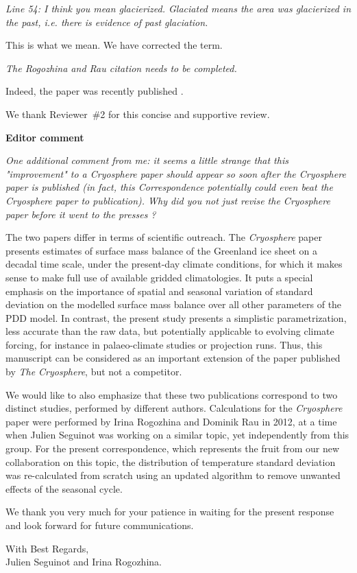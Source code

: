 \documentclass[10pt]{article}
\def\referee#1{\bigskip\textcolor{blue!50!black}{\textit{#1}}}
\begin{document}


\referee{Line 54: I think you mean glacierized. Glaciated means the area was glacierized in the past, i.e. there is evidence of past glaciation.}

This is what we mean. We have corrected the term.

\referee{The Rogozhina and Rau citation needs to be completed.}

Indeed, the paper was recently published \citep{rogozhina-rau-2014}.

We thank Reviewer~{\#}2 for this concise and supportive review.


\bigskip
\textbf{Editor comment}

\referee{One additional comment from me: it seems a little strange that this "improvement" to a \emph{Cryosphere} paper should appear so soon after the \emph{Cryosphere} paper is published (in fact, this Correspondence potentially could even beat the \emph{Cryosphere} paper to publication). Why did you not just revise the \emph{Cryosphere} paper before it went to the presses ?}

The two papers differ in terms of scientific outreach. The \emph{Cryosphere} paper presents estimates of surface mass balance of the Greenland ice sheet on a decadal time scale, under the present-day climate conditions, for which it makes sense to make full use of available gridded climatologies. It puts a special emphasis on the importance of spatial and seasonal variation of standard deviation on the modelled surface mass balance over all other parameters of the PDD model. In contrast, the present study presents a simplistic parametrization, less accurate than the raw data, but potentially applicable to evolving climate forcing, for instance in palaeo-climate studies or projection runs. Thus, this manuscript can be considered as an important extension of the paper published by \emph{The Cryosphere}, but not a competitor.

We would like to also emphasize that these two publications correspond to two distinct studies, performed by different authors. Calculations for the \emph{Cryosphere} paper were performed by Irina Rogozhina and Dominik Rau in 2012, at a time when Julien Seguinot was working on a similar topic, yet independently from this group. For the present correspondence, which represents the fruit from our new collaboration on this topic, the distribution of temperature standard deviation was re-calculated from scratch using an updated algorithm to remove unwanted effects of the seasonal cycle.

We thank you very much for your patience in waiting for the present response and look forward for future communications.

{\flushright
    With Best Regards,\\
    Julien Seguinot and Irina Rogozhina.\\
}



\end{document}
